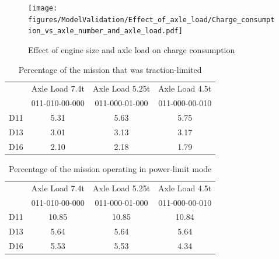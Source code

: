 \documentclass[ExampleMasters.tex]{subfiles}
\begin{document}
\begin{figure}[h!]
\centering
\texttt{[image: figures/ModelValidation/Effect\_of\_axle\_load/Charge\_consumption\_vs\_axle\_number\_and\_axle\_load.pdf]}
\caption{Effect of engine size and axle load on charge consumption}
\label{chargeEngineSizeAxleLoad}
\end{figure}

\begin{table}[h!]                                       
\centering                                              
\begin{tabular}{|c|c|c|c|}                              
\hline                                                  
 & Axle Load 7.4t & Axle Load 5.25t & Axle Load 4.5t \\
 & 011-010-00-000 & 011-000-01-000 & 011-000-00-010 \\
\hline                                                  
D11 & 5.31 & 5.63 & 5.75 \\                            
\hline                                                  
D13 & 3.01 & 3.13 & 3.17 \\ 
\hline                              
D16 & 2.10 & 2.18 & 1.79 \\                                
\hline                                                  
\end{tabular}                                           
\caption{Percentage of the mission that was traction-limited}                                
\label{table:tractionLimitMode}                              
\end{table}  

\begin{table}[h!]                                       
\centering                                              
\begin{tabular}{|c|c|c|c|}                              
\hline                                                  
 & Axle Load 7.4t & Axle Load 5.25t & Axle Load 4.5t \\
 & 011-010-00-000 & 011-000-01-000 & 011-000-00-010 \\
\hline                                                  
D11 & 10.85 & 10.85 & 10.84 \\                            
\hline                                                  
D13 & 5.64 & 5.64 & 5.64 \\ 
\hline                              
D16 & 5.53 & 5.53 & 4.34 \\                                
\hline                                                  
\end{tabular}                                           
\caption{Percentage of the mission operating in power-limit mode}                                
\label{table:powerLimitMode}                              
\end{table}  
\end{document}
